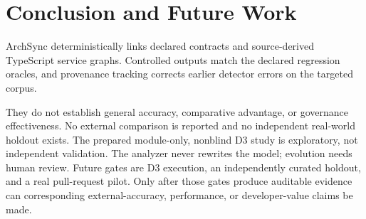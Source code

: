 \section{Conclusion and Future Work}

ArchSync deterministically links declared contracts and source-derived TypeScript service graphs. Controlled outputs match the declared regression oracles, and provenance tracking corrects earlier detector errors on the targeted corpus.

They do not establish general accuracy, comparative advantage, or governance effectiveness. No external comparison is reported and no independent real-world holdout exists. The prepared module-only, nonblind D3 study is exploratory, not independent validation. The analyzer never rewrites the model; evolution needs human review. Future gates are D3 execution, an independently curated holdout, and a real pull-request pilot. Only after those gates produce auditable evidence can corresponding external-accuracy, performance, or developer-value claims be made.
